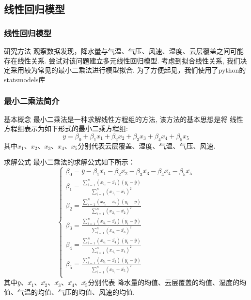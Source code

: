 \documentclass[10pt]{beamer}
\begin{document}
\subsection{线性回归模型}
\begin{frame}
	\frametitle{线性回归模型}

	\begin{block}{研究方法}
		观察数据发现，降水量与气温、气压、风速、湿度、云层覆盖之间可能存在线性关系.
		尝试对该问题建立多元线性回归模型.
		考虑到拟合线性关系, 我们决定采用较为常见的最小二乘法进行模型拟合.
		为了方便起见，我们使用了python的statsmodels库
	\end{block}
\end{frame}

\begin{frame}
	\frametitle{最小二乘法简介}
	\begin{block}{基本概念}
		最小二乘法是一种求解线性方程组的方法, 该方法的基本思想是将
		线性方程组表示为如下形式的最小二乘方程组:
		\begin{equation}
			y = \beta_0 + \beta_1 x_1 + \beta_2 x_2 + \beta_3 x_3 + \beta_4 x_4 + \beta_5 x_5
		\end{equation}
		其中$x_1$、$x_2$、$x_3$、$x_4$、$x_5$分别代表云层覆盖、湿度、气温、气压、风速.
	\end{block}
	\begin{block}{求解公式}
		最小二乘法的求解公式如下所示：
		\begin{equation}
			\begin{cases}
				\beta_0 = \bar{y} - \beta_1 \bar{x_1} - \beta_2 \bar{x_2} - \beta_3 \bar{x_3} - \beta_4 \bar{x_4} - \beta_5 \bar{x_5} \\
				\beta_1 = \frac{\sum_{i=1}^n (x_{1_i} - \bar{x_1}) (y_i - \bar{y})}{\sum_{i=1}^n (x_{1_i} - \bar{x_1})^2}             \\
				\beta_2 = \frac{\sum_{i=1}^n (x_{2_i} - \bar{x_2}) (y_i - \bar{y})}{\sum_{i=1}^n (x_{2_i} - \bar{x_2})^2}             \\
				\beta_3 = \frac{\sum_{i=1}^n (x_{3_i} - \bar{x_3}) (y_i - \bar{y})}{\sum_{i=1}^n (x_{3_i} - \bar{x_3})^2}             \\
				\beta_4 = \frac{\sum_{i=1}^n (x_{4_i} - \bar{x_4}) (y_i - \bar{y})}{\sum_{i=1}^n (x_{4_i} - \bar{x_4})^2}             \\
				\beta_5 = \frac{\sum_{i=1}^n (x_{5_i} - \bar{x_5}) (y_i - \bar{y})}{\sum_{i=1}^n (x_{5_i} - \bar{x_5})^2}             \\
			\end{cases}
		\end{equation}
		其中$\bar{y}$、$\bar{x_1}$、$\bar{x_2}$、$\bar{x_3}$、$\bar{x_4}$、$\bar{x_5}$分别代表
		降水量的均值、云层覆盖的均值、湿度的均值、气温的均值、气压的均值、风速的均值.
	\end{block}
\end{frame}
\end{document}
